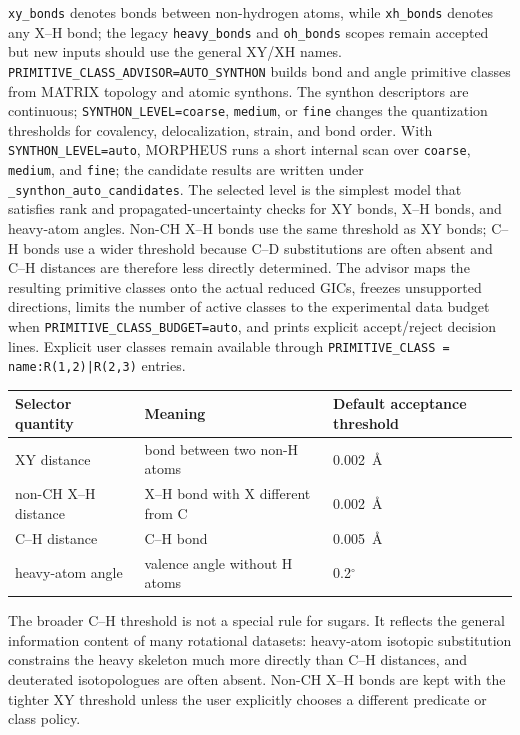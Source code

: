 \documentclass[11pt]{article}
\begin{document}
\texttt{xy\_bonds} denotes bonds between non-hydrogen atoms, while
\texttt{xh\_bonds} denotes any X--H bond; the legacy \texttt{heavy\_bonds} and
\texttt{oh\_bonds} scopes remain accepted but new inputs should use the
general XY/XH names.  \texttt{PRIMITIVE\_CLASS\_ADVISOR=AUTO\_SYNTHON} builds bond and angle
primitive classes from MATRIX topology and atomic synthons.  The synthon
descriptors are continuous; \texttt{SYNTHON\_LEVEL=coarse}, \texttt{medium},
or \texttt{fine} changes the quantization thresholds for covalency,
delocalization, strain, and bond order.  With \texttt{SYNTHON\_LEVEL=auto},
MORPHEUS runs a short internal scan over \texttt{coarse}, \texttt{medium}, and
\texttt{fine}; the candidate results are written under
\texttt{\_synthon\_auto\_candidates}.  The selected level is the simplest model
that satisfies rank and propagated-uncertainty checks for XY bonds,
X--H bonds, and heavy-atom angles.  Non-CH X--H bonds use the same threshold as
XY bonds; C--H bonds use a wider threshold because C--D substitutions are often
absent and C--H distances are therefore less directly determined.  The advisor maps the resulting primitive classes
onto the actual reduced GICs, freezes unsupported directions, limits the number
of active classes to the experimental data budget when
\texttt{PRIMITIVE\_CLASS\_BUDGET=auto}, and prints explicit accept/reject
decision lines.  Explicit user classes remain available through
\texttt{PRIMITIVE\_CLASS = name:R(1,2)|R(2,3)} entries.

\begin{center}
\begin{tabular}{lll}
\toprule
Selector quantity & Meaning & Default acceptance threshold \\
\midrule
XY distance & bond between two non-H atoms & 0.002~\AA{} \\
non-CH X--H distance & X--H bond with X different from C & 0.002~\AA{} \\
C--H distance & C--H bond & 0.005~\AA{} \\
heavy-atom angle & valence angle without H atoms & 0.2$^\circ$ \\
\bottomrule
\end{tabular}
\end{center}

The broader C--H threshold is not a special rule for sugars.  It reflects the
general information content of many rotational datasets: heavy-atom isotopic
substitution constrains the heavy skeleton much more directly than C--H distances,
and deuterated isotopologues are often absent.  Non-CH X--H bonds are kept with
the tighter XY threshold unless the user explicitly chooses a different predicate
or class policy.
\end{document}
